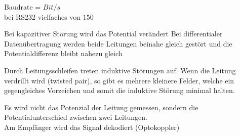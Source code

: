 \documentclass[letterpaper,10pt,english]{jupyterBook}
\begin{document}
\sphinxAtStartPar
Baudrate = \(Bit/s\)\\
bei RS232 vielfaches von \(150\)

\begin{DUlineblock}{0em}
\item[] 
\end{DUlineblock}

\begin{DUlineblock}{0em}
\item[] 
\end{DUlineblock}

\sphinxAtStartPar
Bei kapazitiver Störung wird das Potential verändert
Bei differentialer Datenübertragung werden beide Leitungen beinahe gleich gestört
und die Potentialdifferenz bleibt nahezu gleich

\begin{DUlineblock}{0em}
\item[] 
\end{DUlineblock}

\sphinxAtStartPar
Durch Leitungsschleifen treten induktive Störungen auf.
Wenn die Leitung verdrillt wird (twisted pair), so gibt es mehrere kleinere Felder,
welche ein gegengleiches Vorzeichen und somit die induktive Störung minimal halten.

\begin{DUlineblock}{0em}
\item[] 
\end{DUlineblock}

\sphinxAtStartPar
Es wird nicht das Potenzial der Leitung gemessen,
sondern die Potentialunterschied zwischen zwei Leitungen.\\
Am Empfänger wird das Signal dekodiert (Optokoppler)

\begin{DUlineblock}{0em}
\item[] 
\end{DUlineblock}

\begin{DUlineblock}{0em}
\item[] 
\end{DUlineblock}
\end{document}
